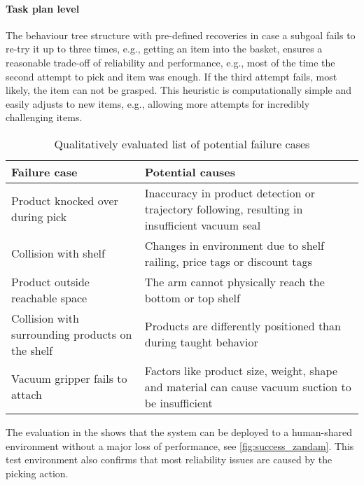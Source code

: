 \paragraph{Task plan level} The behaviour tree structure with pre-defined recoveries in case a subgoal fails to re-try it up to three times, e.g., getting an item into the basket, ensures a reasonable trade-off of reliability and performance, e.g., most of the time the second attempt to pick and item was enough. If the third attempt fails, most likely, the item can not be grasped. This heuristic is computationally simple and easily adjusts to new items, e.g., allowing more attempts for incredibly challenging items.
\begin{table*}[t]
    \centering
    \begin{tabular}{p{.4\linewidth}p{.5\linewidth}}
        \hline
        Failure case & Potential causes \\
        \hline
        Product knocked over during pick & Inaccuracy in product detection or trajectory following, resulting in insufficient vacuum seal \\
        \hdashline
        Collision with shelf & Changes in environment due to shelf railing, price tags or discount tags \\
        \hdashline
        Product outside reachable space  & The arm cannot physically reach the bottom or top shelf \\
        \hdashline
        Collision with surrounding products on the shelf & Products are differently positioned than during taught behavior \\
        \hdashline
        Vacuum gripper fails to attach & Factors like product size, weight, shape and material can cause vacuum suction to be insufficient \\
        \hline
    \end{tabular}
    \caption{Qualitatively evaluated list of potential failure cases}
    \label{tab:failure_cases}
\end{table*}


The evaluation in the \realsupermarket{} shows that the system
can be deployed to a human-shared environment without a major loss of performance, see
\cref{fig:success_zandam}. This test environment also
confirms that most reliability issues are caused by the
picking action.









